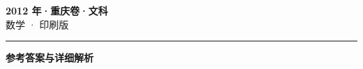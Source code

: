 \documentclass[zihao=5, a4paper]{ctexart}
\begin{document}
\begin{center}
  {\Large\bfseries 2012 年·重庆卷·文科}\\[4pt]
  {\large 数学 · 印刷版}
\end{center}
\medskip
{}

\par\bigskip\hrule\bigskip
{}
\Needspace{0.55\textheight}
\begin{center}{\large\bfseries 参考答案与详细解析}\end{center}
\smallskip

\end{document}
